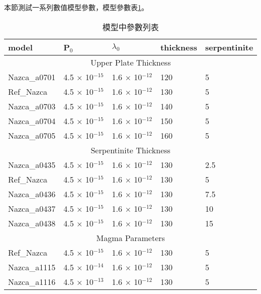 本節測試一系列數值模型參數，模型參數表\ref{模型參數列表}。
\newpage
\begin{table}[htp]\large
    \caption[模型參數列表]{模型中參數列表}
    \label{模型參數列表}
    \renewcommand{\arraystretch}{1.2}
    \begin{tabular}{|lllll|}
    \hline
    model        & P$_0$              & $\lambda_0$                  & thickness & serpentinite \\ \hline
    \multicolumn{5}{|c|}{Upper Plate Thickness}                                                 \\ \hline
    Nazca\_a0701 & 4.5 $\times$ 10$^{-15}$ & 1.6 $\times$ 10$^{-12}$ & 120       & 5            \\
    Ref\_Nazca   & 4.5 $\times$ 10$^{-15}$ & 1.6 $\times$ 10$^{-12}$ & 130       & 5            \\
    Nazca\_a0703 & 4.5 $\times$ 10$^{-15}$ & 1.6 $\times$ 10$^{-12}$ & 140       & 5            \\
    Nazca\_a0704 & 4.5 $\times$ 10$^{-15}$ & 1.6 $\times$ 10$^{-12}$ & 150       & 5            \\
    Nazca\_a0705 & 4.5 $\times$ 10$^{-15}$ & 1.6 $\times$ 10$^{-12}$ & 160       & 5            \\ \hline
    \multicolumn{5}{|c|}{Serpentinite Thickness}                                                \\ \hline
    Nazca\_a0435 & 4.5 $\times$ 10$^{-15}$ & 1.6 $\times$ 10$^{-12}$ & 130       & 2.5          \\
    Ref\_Nazca   & 4.5 $\times$ 10$^{-15}$ & 1.6 $\times$ 10$^{-12}$ & 130       & 5            \\
    Nazca\_a0436 & 4.5 $\times$ 10$^{-15}$ & 1.6 $\times$ 10$^{-12}$ & 130       & 7.5          \\
    Nazca\_a0437 & 4.5 $\times$ 10$^{-15}$ & 1.6 $\times$ 10$^{-12}$ & 130       & 10           \\
    Nazca\_a0438 & 4.5 $\times$ 10$^{-15}$ & 1.6 $\times$ 10$^{-12}$ & 130       & 15           \\ \hline
    \multicolumn{5}{|c|}{Magma Parameters}                                                      \\ \hline
    Ref\_Nazca   & 4.5 $\times$ 10$^{-15}$ & 1.6 $\times$ 10$^{-12}$ & 130       & 5            \\
    Nazca\_a1115 & 4.5 $\times$ 10$^{-14}$ & 1.6 $\times$ 10$^{-12}$ & 130       & 5            \\
    Nazca\_a1116 & 4.5 $\times$ 10$^{-13}$ & 1.6 $\times$ 10$^{-12}$ & 130       & 5            \\

\end{tabular}
\end{table}
